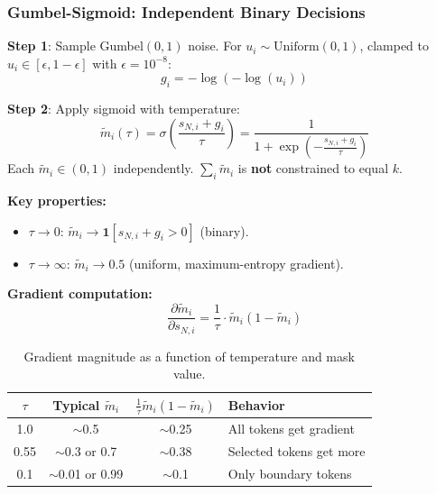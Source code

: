 \documentclass[11pt,a4paper]{article}
\begin{document}
\subsubsection{Gumbel-Sigmoid: Independent Binary Decisions}

\begin{definitionbox}[title={Gumbel-Sigmoid Soft Mask}]
\textbf{Step 1}: Sample Gumbel$(0,1)$ noise.
For $u_i \sim \text{Uniform}(0,1)$, clamped to
$u_i \in [\epsilon, 1{-}\epsilon]$ with $\epsilon = 10^{-8}$:
\begin{equation}
  g_i = -\log(-\log(u_i))
\end{equation}

\textbf{Step 2}: Apply sigmoid with temperature:
\begin{equation}
  \tilde{m}_i(\tau) = \sigma\!\left(\frac{s_{N,i} + g_i}{\tau}\right)
    = \frac{1}{1 + \exp\!\left(-\frac{s_{N,i} + g_i}{\tau}\right)}
  \label{eq:gumbel_sigmoid}
\end{equation}
Each $\tilde{m}_i \in (0,1)$ independently. $\sum_i \tilde{m}_i$ is
\textbf{not} constrained to equal $k$.
\end{definitionbox}

\textbf{Key properties:}
\begin{itemize}[leftmargin=1.5em, itemsep=1pt]
  \item $\tau \to 0$:
    $\tilde{m}_i \to \mathbf{1}[s_{N,i} + g_i > 0]$ (binary).
  \item $\tau \to \infty$:
    $\tilde{m}_i \to 0.5$ (uniform, maximum-entropy gradient).
\end{itemize}

\textbf{Gradient computation:}
\begin{equation}
  \frac{\partial \tilde{m}_i}{\partial s_{N,i}}
    = \frac{1}{\tau} \cdot \tilde{m}_i(1 - \tilde{m}_i)
  \label{eq:gumbel_grad}
\end{equation}

\begin{table}[h]
\centering
\caption{Gradient magnitude as a function of temperature and mask value.}
\label{tab:grad_magnitude}
\renewcommand{\arraystretch}{1.15}
\small
\begin{tabular}{@{}cccl@{}}
  \toprule
  $\tau$ & Typical $\tilde{m}_i$ &
    $\frac{1}{\tau}\tilde{m}_i(1{-}\tilde{m}_i)$ & Behavior \\
  \midrule
  1.0 & $\sim$0.5 & $\sim$0.25 & All tokens get gradient \\
  0.55 & $\sim$0.3 or 0.7 & $\sim$0.38 & Selected tokens get more \\
  0.1 & $\sim$0.01 or 0.99 & $\sim$0.1 & Only boundary tokens \\
  \bottomrule
\end{tabular}
\end{table}
\end{document}

